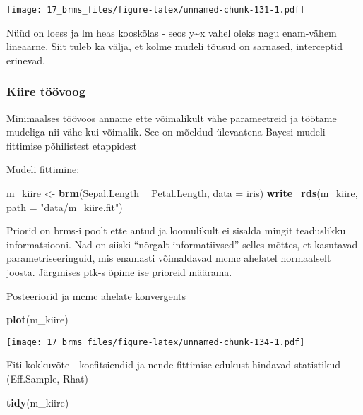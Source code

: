 \documentclass[]{article}
\newenvironment{Shaded}{\begin{snugshade}}{\end{snugshade}}
\newcommand{\KeywordTok}[1]{\textcolor[rgb]{0.13,0.29,0.53}{\textbf{#1}}}
\newcommand{\DataTypeTok}[1]{\textcolor[rgb]{0.13,0.29,0.53}{#1}}
\newcommand{\StringTok}[1]{\textcolor[rgb]{0.31,0.60,0.02}{#1}}
\newcommand{\OperatorTok}[1]{\textcolor[rgb]{0.81,0.36,0.00}{\textbf{#1}}}
\newcommand{\NormalTok}[1]{#1}
\begin{document}
\texttt{[image: 17\_brms\_files/figure-latex/unnamed-chunk-131-1.pdf]}

Nüüd on loess ja lm heas kooskõlas - seos y\textasciitilde{}x vahel
oleks nagu enam-vähem lineaarne. Siit tuleb ka välja, et kolme mudeli
tõusud on sarnased, interceptid erinevad.

\subsubsection{Kiire töövoog}\label{kiire-toovoog}

Minimaalses töövoos anname ette võimalikult vähe parameetreid ja töötame
mudeliga nii vähe kui võimalik. See on mõeldud ülevaatena Bayesi mudeli
fittimise põhilistest etappidest

Mudeli fittimine:

\begin{Shaded}
\begin{Highlighting}[]
\NormalTok{m_kiire <-}\StringTok{ }\KeywordTok{brm}\NormalTok{(Sepal.Length }\OperatorTok{~}\StringTok{ }\NormalTok{Petal.Length, }\DataTypeTok{data =}\NormalTok{ iris)}
\KeywordTok{write_rds}\NormalTok{(m_kiire, }\DataTypeTok{path =} \StringTok{"data/m_kiire.fit"}\NormalTok{)}
\end{Highlighting}
\end{Shaded}

Priorid on brms-i poolt ette antud ja loomulikult ei sisalda mingit
teaduslikku informatsiooni. Nad on siiski ``nõrgalt informatiivsed''
selles mõttes, et kasutavad parametriseeringuid, mis enamasti
võimaldavad mcmc ahelatel normaalselt joosta. Järgmises ptk-s õpime ise
prioreid määrama.

Posteeriorid ja mcmc ahelate konvergents

\begin{Shaded}
\begin{Highlighting}[]
\KeywordTok{plot}\NormalTok{(m_kiire)}
\end{Highlighting}
\end{Shaded}

\texttt{[image: 17\_brms\_files/figure-latex/unnamed-chunk-134-1.pdf]}

Fiti kokkuvõte - koefitsiendid ja nende fittimise edukust hindavad
statistikud (Eff.Sample, Rhat)

\begin{Shaded}
\begin{Highlighting}[]
\KeywordTok{tidy}\NormalTok{(m_kiire)}
\end{Highlighting}
\end{Shaded}
\end{document}
